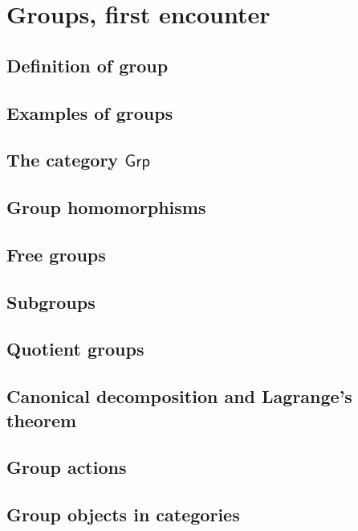 \chapter{Groups, first encounter}

\section{Definition of group}

\section{Examples of groups}

\section{The category $\mathsf{Grp}$}

\section{Group homomorphisms}

\section{Free groups}

\section{Subgroups}

\section{Quotient groups}

\section{Canonical decomposition and Lagrange's theorem}

\section{Group actions}

\section{Group objects in categories}
